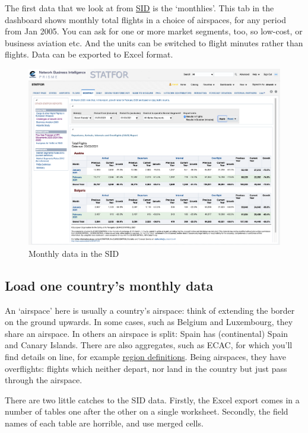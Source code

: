 \documentclass[
]{book}
\begin{document}
The first data that we look at from \href{https://www.eurocontrol.int/dashboard/statfor-interactive-dashboard}{SID} is the `monthlies'. This tab in the dashboard shows monthly total flights in a choice of airspaces, for any period from Jan 2005. You can ask for one or more market segments, too, so low-cost, or business aviation etc. And the units can be switched to flight minutes rather than flights. Data can be exported to Excel format.

\begin{figure}
\centering
\includegraphics{images/SID_Monthly.png}
\caption{Monthly data in the SID}
\end{figure}

\hypertarget{loadonemonthly}{%
\subsection{Load one country's monthly data}\label{loadonemonthly}}

An `airspace' here is usually a country's airspace: think of extending the border on the ground upwards. In some cases, such as Belgium and Luxembourg, they share an airspace. In others an airspace is split: Spain has (continental) Spain and Canary Islands. There are also aggregates, such as ECAC, for which you'll find details on line, for example \href{https://www.eurocontrol.int/publication/eurocontrol-five-year-forecast-2020-2024}{region definitions}. Being airspaces, they have overflights: flights which neither depart, nor land in the country but just pass through the airspace.

There are two little catches to the SID data. Firstly, the Excel export comes in a number of tables one after the other on a single worksheet. Secondly, the field names of each table are horrible, and use merged cells.
\end{document}
